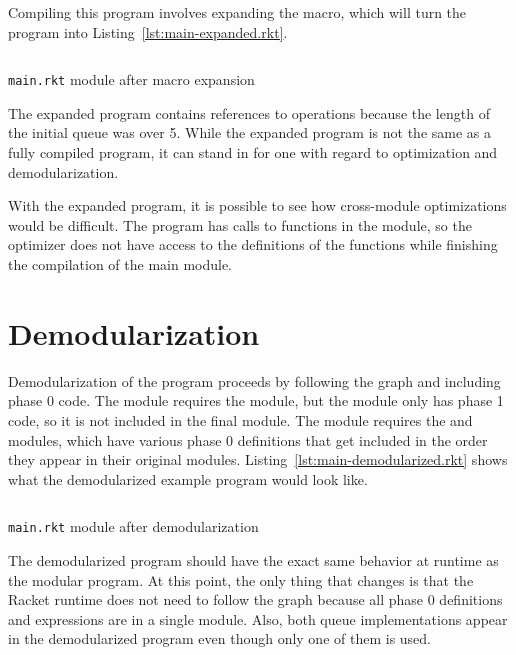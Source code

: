 Compiling this program involves expanding the  macro, which will turn the program into Listing~\ref{lst:main-expanded.rkt}.

\begin{listing}
  \inputminted{racket}{listings/main-expanded.rkt}
  \caption{\texttt{main.rkt} module after macro expansion}
  \label{lst:main-expanded.rkt}
\end{listing}

The expanded program contains references to  operations because the length of the initial queue was over 5.
While the expanded program is not the same as a fully compiled program, it can stand in for one with regard to optimization and demodularization.

With the expanded program, it is possible to see how cross-module optimizations would be difficult.
The program has calls to functions in the  module, so the optimizer does not have access to the definitions of the functions while finishing the compilation of the main module.

\section{Demodularization}

Demodularization of the program proceeds by following the  graph and including phase 0 code. 
The  module requires the  module, but the  module only has phase 1 code, so it is not included in the final module.
The  module requires the  and  modules, which have various phase 0 definitions that get included in the order they appear in their original modules.
Listing~\ref{lst:main-demodularized.rkt} shows what the demodularized example program would look like.

\begin{listing}
  \inputminted{racket}{listings/main-demodularized.rkt}
  \caption{\texttt{main.rkt} module after demodularization}
  \label{lst:main-demodularized.rkt}
\end{listing}

The demodularized program should have the exact same behavior at runtime as the modular program.
At this point, the only thing that changes is that the Racket runtime does not need to follow the  graph because all phase 0 definitions and expressions are in a single module.
Also, both queue implementations appear in the demodularized program even though only one of them is used.


